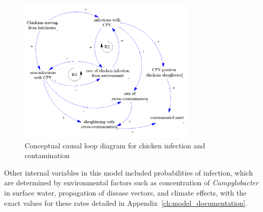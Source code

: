 \begin{figure}[h]
\centering
\includegraphics[width=0.75\textwidth]{images/Transmission submodel.png}
\caption{Conceptual causal loop diagram for chicken infection and contamination}
\label{fig:transmission_submodel}
\end{figure}

Other internal variables in this model included probabilities of infection, which are determined by environmental factors such as concentration of \textit{Campylobacter} in surface water, propagation of disease vectors, and climate effects, with the exact values for these rates detailed in Appendix~\ref{ch:model_documentation}.


